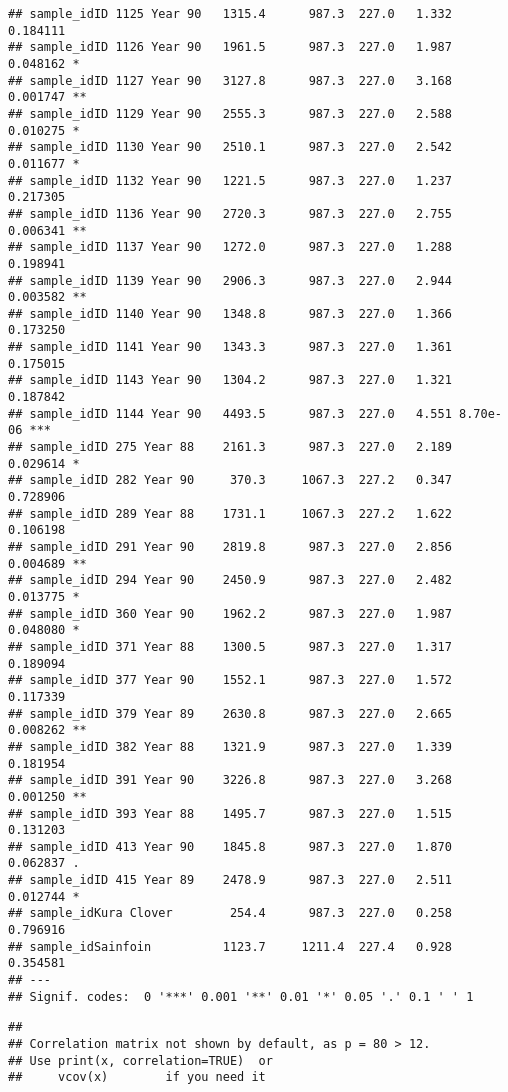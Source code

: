 \documentclass[
]{article}
\begin{document}
\begin{verbatim}
## sample_idID 1125 Year 90   1315.4      987.3  227.0   1.332 0.184111    
## sample_idID 1126 Year 90   1961.5      987.3  227.0   1.987 0.048162 *  
## sample_idID 1127 Year 90   3127.8      987.3  227.0   3.168 0.001747 ** 
## sample_idID 1129 Year 90   2555.3      987.3  227.0   2.588 0.010275 *  
## sample_idID 1130 Year 90   2510.1      987.3  227.0   2.542 0.011677 *  
## sample_idID 1132 Year 90   1221.5      987.3  227.0   1.237 0.217305    
## sample_idID 1136 Year 90   2720.3      987.3  227.0   2.755 0.006341 ** 
## sample_idID 1137 Year 90   1272.0      987.3  227.0   1.288 0.198941    
## sample_idID 1139 Year 90   2906.3      987.3  227.0   2.944 0.003582 ** 
## sample_idID 1140 Year 90   1348.8      987.3  227.0   1.366 0.173250    
## sample_idID 1141 Year 90   1343.3      987.3  227.0   1.361 0.175015    
## sample_idID 1143 Year 90   1304.2      987.3  227.0   1.321 0.187842    
## sample_idID 1144 Year 90   4493.5      987.3  227.0   4.551 8.70e-06 ***
## sample_idID 275 Year 88    2161.3      987.3  227.0   2.189 0.029614 *  
## sample_idID 282 Year 90     370.3     1067.3  227.2   0.347 0.728906    
## sample_idID 289 Year 88    1731.1     1067.3  227.2   1.622 0.106198    
## sample_idID 291 Year 90    2819.8      987.3  227.0   2.856 0.004689 ** 
## sample_idID 294 Year 90    2450.9      987.3  227.0   2.482 0.013775 *  
## sample_idID 360 Year 90    1962.2      987.3  227.0   1.987 0.048080 *  
## sample_idID 371 Year 88    1300.5      987.3  227.0   1.317 0.189094    
## sample_idID 377 Year 90    1552.1      987.3  227.0   1.572 0.117339    
## sample_idID 379 Year 89    2630.8      987.3  227.0   2.665 0.008262 ** 
## sample_idID 382 Year 88    1321.9      987.3  227.0   1.339 0.181954    
## sample_idID 391 Year 90    3226.8      987.3  227.0   3.268 0.001250 ** 
## sample_idID 393 Year 88    1495.7      987.3  227.0   1.515 0.131203    
## sample_idID 413 Year 90    1845.8      987.3  227.0   1.870 0.062837 .  
## sample_idID 415 Year 89    2478.9      987.3  227.0   2.511 0.012744 *  
## sample_idKura Clover        254.4      987.3  227.0   0.258 0.796916    
## sample_idSainfoin          1123.7     1211.4  227.4   0.928 0.354581    
## ---
## Signif. codes:  0 '***' 0.001 '**' 0.01 '*' 0.05 '.' 0.1 ' ' 1
\end{verbatim}

\begin{verbatim}
## 
## Correlation matrix not shown by default, as p = 80 > 12.
## Use print(x, correlation=TRUE)  or
##     vcov(x)        if you need it
\end{verbatim}
\end{document}
